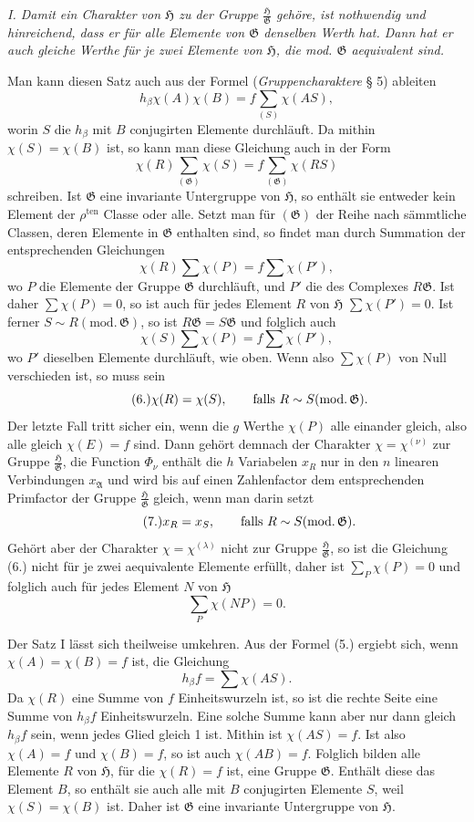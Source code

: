 \documentclass[11pt]{article}
\newcommand{\Hgr}{\mathfrak{H}}
\newcommand{\Ggr}{\mathfrak{G}}
\begin{document}
\emph{I. Damit ein Charakter von $\Hgr$ zu der Gruppe $\frac{\Hgr}{\Ggr}$ gehöre, ist nothwendig und hinreichend, dass er für alle Elemente von $\Ggr$ denselben Werth hat. Dann hat er auch gleiche Werthe für je zwei Elemente von $\Hgr$, die mod. $\Ggr$ aequivalent sind.}

Man kann diesen Satz auch aus der Formel (\emph{Gruppencharaktere} § 5) ableiten
\[
\tag{5.}
  h_\beta\chi(A)\chi(B)=f\sum_{(S)}\chi(AS),
\]
worin $S$ die $h_\beta$ mit $B$ conjugirten Elemente durchläuft. Da mithin $\chi(S)=\chi(B)$ ist, so kann man diese Gleichung auch in der Form
\[
  \chi(R)\sum_{(\Ggr)}\chi(S)=f\sum_{(\Ggr)}\chi(RS)
\]
schreiben. Ist $\Ggr$ eine invariante Untergruppe von $\Hgr$, so enthält sie entweder kein Element der $\rho^{\mathrm{ten}}$ Classe oder alle. Setzt man für $(\Ggr)$ der Reihe nach sämmtliche Classen, deren Elemente in $\Ggr$ enthalten sind, so findet man durch Summation der entsprechenden Gleichungen
\[
  \chi(R)\sum\chi(P)=f\sum\chi(P'),
\]
wo $P$ die Elemente der Gruppe $\Ggr$ durchläuft, und $P'$ die des Complexes $R\Ggr$. Ist daher $\sum\chi(P)=0$, so ist auch für jedes Element $R$ von $\Hgr$ $\sum\chi(P')=0$. Ist ferner $S\sim R(\mathrm{mod.}\,\Ggr)$, so ist $R\Ggr=S\Ggr$ und folglich auch
\[
  \chi(S)\sum\chi(P)=f\sum\chi(P'),
\]
wo $P'$ dieselben Elemente durchläuft, wie oben. Wenn also $\sum\chi(P)$ von Null verschieden ist, so muss sein
\[
\tag{6.}
  \chi(R)=\chi(S),\qquad \hbox{falls } R\sim S(\mathrm{mod.}\,\Ggr).
\]
Der letzte Fall tritt sicher ein, wenn die $g$ Werthe $\chi(P)$ alle einander gleich, also alle gleich $\chi(E)=f$ sind. Dann gehört demnach der Charakter $\chi=\chi^{(\nu)}$ zur Gruppe $\frac{\Hgr}{\Ggr}$, die Function $\Phi_\nu$ enthält die $h$ Variabelen $x_R$ nur in den $n$ linearen Verbindungen $x_{\mathfrak A}$ und wird bis auf einen Zahlenfactor dem entsprechenden Primfactor der Gruppe $\frac{\Hgr}{\Ggr}$ gleich, wenn man darin setzt
\[
\tag{7.}
  x_R=x_S,\qquad \hbox{falls } R\sim S(\mathrm{mod.}\,\Ggr).
\]
Gehört aber der Charakter $\chi=\chi^{(\lambda)}$ nicht zur Gruppe $\frac{\Hgr}{\Ggr}$, so ist die Gleichung (6.) nicht für je zwei aequivalente Elemente erfüllt, daher ist $\sum_P\chi(P)=0$ und folglich auch für jedes Element $N$ von $\Hgr$
\[
\tag{8.}
  \sum_P\chi(NP)=0.
\]

Der Satz I lässt sich theilweise umkehren. Aus der Formel (5.) ergiebt sich, wenn $\chi(A)=\chi(B)=f$ ist, die Gleichung
\[
  h_\beta f=\sum\chi(AS).
\]
Da $\chi(R)$ eine Summe von $f$ Einheitswurzeln ist, so ist die rechte Seite eine Summe von $h_\beta f$ Einheitswurzeln. Eine solche Summe kann aber nur dann gleich $h_\beta f$ sein, wenn jedes Glied gleich 1 ist. Mithin ist $\chi(AS)=f$. Ist also $\chi(A)=f$ und $\chi(B)=f$, so ist auch $\chi(AB)=f$. Folglich bilden alle Elemente $R$ von $\Hgr$, für die $\chi(R)=f$ ist, eine Gruppe $\Ggr$. Enthält diese das Element $B$, so enthält sie auch alle mit $B$ conjugirten Elemente $S$, weil $\chi(S)=\chi(B)$ ist. Daher ist $\Ggr$ eine invariante Untergruppe von $\Hgr$.
\end{document}
